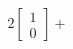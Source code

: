 \documentclass[preview]{standalone}
\begin{document}
\begin{align*}
2\begin{bmatrix} 1 \\ 0 \end{bmatrix} +
\end{align*}
\end{document}
